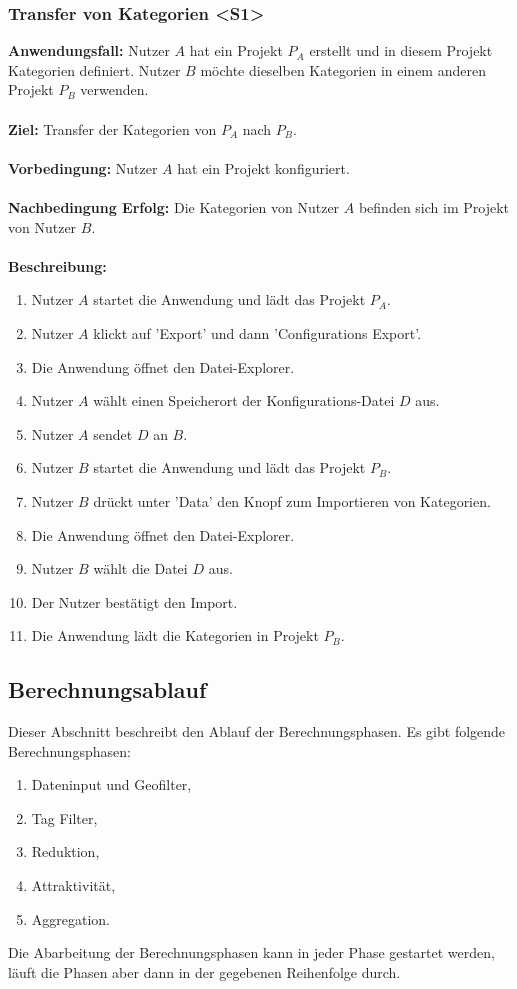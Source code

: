 \documentclass[parskip=full]{scrartcl} %
\begin{document}
\subsubsection*{Transfer von Kategorien <S1>}
\textbf{Anwendungsfall:} Nutzer $A$ hat ein Projekt $P_A$ erstellt und in diesem Projekt Kategorien definiert. Nutzer $B$ möchte dieselben Kategorien in einem anderen Projekt $P_B$ verwenden.\\\\
\textbf{Ziel:} Transfer der Kategorien von $P_A$ nach $P_B$.\\\\
\textbf{Vorbedingung:} Nutzer $A$ hat ein Projekt konfiguriert.\\\\
\textbf{Nachbedingung Erfolg:} Die Kategorien von Nutzer $A$ befinden sich im Projekt von Nutzer $B$.\\\\
\textbf{Beschreibung:}
\begin{enumerate}
    \item Nutzer $A$ startet die Anwendung und lädt das Projekt $P_A$.
    \item Nutzer $A$ klickt auf 'Export' und dann 'Configurations Export'.
    \item Die Anwendung öffnet den Datei-Explorer.
    \item Nutzer $A$ wählt einen Speicherort der Konfigurations-Datei $D$ aus.
    \item Nutzer $A$ sendet $D$ an $B$.
    \item Nutzer $B$ startet die Anwendung und lädt das Projekt $P_B$.
    \item Nutzer $B$ drückt unter 'Data' den Knopf zum Importieren von Kategorien.
    \item Die Anwendung öffnet den Datei-Explorer.
    \item Nutzer $B$ wählt die Datei $D$ aus.
    \item Der Nutzer bestätigt den Import.
    \item Die Anwendung lädt die Kategorien in Projekt $P_B$.
\end{enumerate}
\newpage






\subsection{Berechnungsablauf} \hypertarget{calculations}{}
Dieser Abschnitt beschreibt den Ablauf der Berechnungsphasen. Es gibt folgende Berechnungsphasen:
\begin{enumerate}
    \item Dateninput und Geofilter,
    \item Tag Filter,
    \item Reduktion,
    \item Attraktivität,
    \item Aggregation.
\end{enumerate}
Die Abarbeitung der Berechnungsphasen kann in jeder Phase gestartet werden, läuft die Phasen aber dann in der gegebenen Reihenfolge durch.
\end{document}
